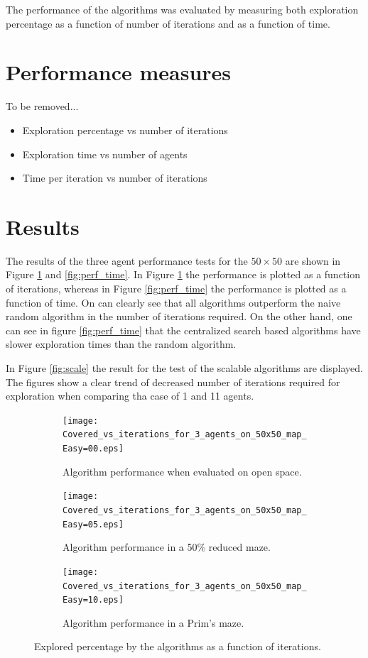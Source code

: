 \documentclass{article}
\begin{document}
The performance of the algorithms was evaluated by measuring both exploration
percentage as a function of number of iterations and as a function of time.


\section{Performance measures}
To be removed...
\begin{itemize}
\item Exploration percentage vs number of iterations
\item Exploration time vs number of agents
\item Time per iteration vs number of iterations
\end{itemize}

\section{Results}
The results of the three agent performance tests for the $50 \times 50$ are
shown in Figure \ref{fig:perf_iters} and \ref{fig:perf_time}. In Figure
\ref{fig:perf_iters} the performance is plotted as a function of iterations,
whereas in Figure \ref{fig:perf_time} the performance is plotted as a function
of time. On can clearly see that all algorithms outperform the naive random
algorithm in the number of iterations required. On the other hand, one can see
in figure \ref{fig:perf_time} that the centralized search based algorithms have
slower exploration times than the random algorithm.

In Figure \ref{fig:scale} the result for the test of the scalable algorithms are
displayed. The figures show a clear trend of decreased number of iterations
required for exploration when comparing tha case of 1 and 11 agents.

\begin{figure}[H]
    \centering
    \begin{subfigure}[b]{0.45\textwidth}
        \texttt{[image: Covered\_vs\_iterations\_for\_3\_agents\_on\_50x50\_map\_Easy=00.eps]}
        \caption{ Algorithm performance when evaluated on open space.}
    \end{subfigure}
    \begin{subfigure}[b]{0.45\textwidth}
        \texttt{[image: Covered\_vs\_iterations\_for\_3\_agents\_on\_50x50\_map\_Easy=05.eps]}
        \caption{ Algorithm performance in a 50\% reduced maze. }
    \end{subfigure}

    \begin{subfigure}[b]{0.45\textwidth}
        \texttt{[image: Covered\_vs\_iterations\_for\_3\_agents\_on\_50x50\_map\_Easy=10.eps]}
        \caption{ Algorithm performance in a Prim's maze. }
    \end{subfigure}
    
    \caption{Explored percentage by the algorithms as a function of
      iterations.}
    \label{fig:perf_iters}
\end{figure}
\end{document}
